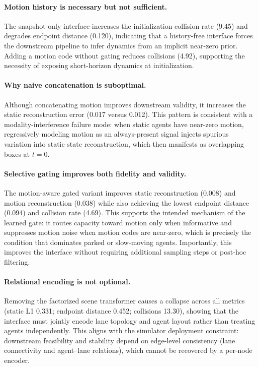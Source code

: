 \documentclass{article}
\theoremstyle{plain}
\theoremstyle{definition}
\theoremstyle{remark}
\begin{document}
\paragraph{Motion history is necessary but not sufficient.}
The snapshot-only interface increases the initialization collision rate (9.45) and degrades endpoint distance (0.120),
indicating that a history-free interface forces the downstream pipeline to infer dynamics from an implicit near-zero prior.
Adding a motion code without gating reduces collisions (4.92), supporting the necessity of exposing short-horizon dynamics at initialization.

\paragraph{Why naive concatenation is suboptimal.}
Although concatenating motion improves downstream validity, it increases the static reconstruction error (0.017 versus 0.012).
This pattern is consistent with a modality-interference failure mode: when static agents have near-zero motion, regressively modeling motion as an always-present signal injects spurious variation into static state reconstruction, which then manifests as overlapping boxes at \(t=0\).

\paragraph{Selective gating improves both fidelity and validity.}
The motion-aware gated variant improves static reconstruction (0.008) and motion reconstruction (0.038) while also achieving the lowest endpoint distance (0.094) and collision rate (4.69). This supports the intended mechanism of the learned gate: it routes capacity toward motion only when informative and suppresses motion noise when motion codes are near-zero, which is precisely the condition that dominates parked or slow-moving agents.
Importantly, this improves the interface without requiring additional sampling steps or post-hoc filtering.

\paragraph{Relational encoding is not optional.}
Removing the factorized scene transformer causes a collapse across all metrics (static L1 0.331; endpoint distance 0.452; collisions 13.30), showing that the interface must jointly encode lane topology and agent layout rather than treating agents independently. This aligns with the simulator deployment constraint: downstream feasibility and stability depend on edge-level consistency (lane connectivity and agent--lane relations), which cannot be recovered by a per-node encoder.
\end{document}
